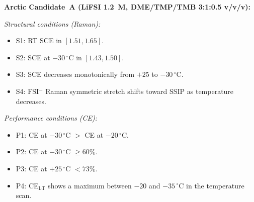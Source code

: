 \documentclass[11pt]{article}
\theoremstyle{plain}
\theoremstyle{definition}
\theoremstyle{remark}
\begin{document}
\noindent\textbf{Arctic Candidate~A (LiFSI 1.2~M,
DME/TMP/TMB 3:1:0.5 v/v/v):}

\medskip
\noindent\textit{Structural conditions (Raman):}
\begin{itemize}[leftmargin=2em]
  \item S1: RT SCE in $[1.51, 1.65]$.
  \item S2: SCE at $-30\,^\circ$C in $[1.43, 1.50]$.
  \item S3: SCE decreases monotonically from $+25$ to $-30\,^\circ$C.
  \item S4: FSI$^-$ Raman symmetric stretch shifts toward SSIP
        as temperature decreases.
\end{itemize}

\noindent\textit{Performance conditions (CE):}
\begin{itemize}[leftmargin=2em]
  \item P1: CE at $-30\,^\circ$C $>$ CE at $-20\,^\circ$C.
  \item P2: CE at $-30\,^\circ$C $\geq 60\%$.
  \item P3: CE at $+25\,^\circ$C $< 73\%$.
  \item P4: CE$_\mathrm{LT}$ shows a maximum between $-20$ and
        $-35\,^\circ$C in the temperature scan.
\end{itemize}
\end{document}
